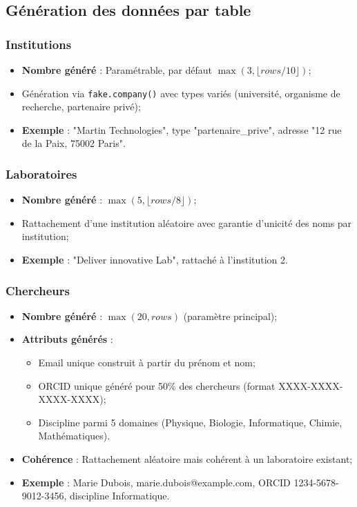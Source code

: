\documentclass[12pt,a4paper]{article}
\begin{document}
\subsection{Génération des données par table}

\subsubsection{Institutions}
\begin{itemize}
    \item \textbf{Nombre généré} : Paramétrable, par défaut $\max(3, \lfloor rows/10 \rfloor)$;
    \item Génération via \texttt{fake.company()} avec types variés (université, organisme de recherche, partenaire privé);
    \item \textbf{Exemple} : "Martin Technologies", type "partenaire\_prive", adresse "12 rue de la Paix, 75002 Paris".
\end{itemize}

\subsubsection{Laboratoires}
\begin{itemize}
    \item \textbf{Nombre généré} : $\max(5, \lfloor rows/8 \rfloor)$;
    \item Rattachement d'une institution aléatoire avec garantie d'unicité des noms par institution;
    \item \textbf{Exemple} : "Deliver innovative Lab", rattaché à l'institution 2.
\end{itemize}

\subsubsection{Chercheurs}
\begin{itemize}
    \item \textbf{Nombre généré} : $\max(20, rows)$ (paramètre principal);
    \item \textbf{Attributs générés} :
    \begin{itemize}
        \item Email unique construit à partir du prénom et nom;
        \item ORCID unique généré pour 50\% des chercheurs (format XXXX-XXXX-XXXX-XXXX);
        \item Discipline parmi 5 domaines (Physique, Biologie, Informatique, Chimie, Mathématiques).
    \end{itemize}
    \item \textbf{Cohérence} : Rattachement aléatoire mais cohérent à un laboratoire existant;
    \item \textbf{Exemple} : Marie Dubois, marie.dubois@example.com, ORCID 1234-5678-9012-3456, discipline Informatique.
\end{itemize}
\end{document}
